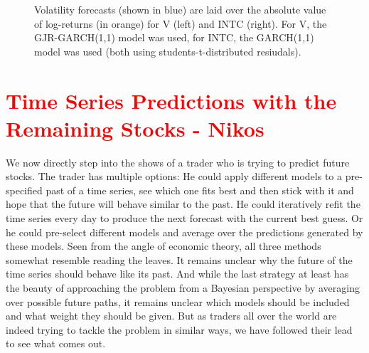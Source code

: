 \begin{figure}[h]
    \centering
    \begin{adjustbox}{width = 0.95\textwidth}
    
    
    \end{adjustbox}
    \caption{Volatility forecasts (shown in blue) are laid over the absolute value of log-returns (in orange) for V (left) and INTC (right). For V, the GJR-GARCH(1,1) model was used, for INTC, the GARCH(1,1) model was used (both using students-t-distributed resiudals).}
    \label{fig:volatility_pred}
\end{figure}{}


\section{\textcolor{red}{Time Series Predictions with the Remaining Stocks - Nikos}}

We now directly step into the shows of a trader who is trying to  predict future stocks. The trader has multiple options: He could apply different models to a pre-specified past of a time series, see which one fits best and then stick with it and hope that the future will behave similar to the past. He could iteratively refit the time series every day to produce the next forecast with the current best guess. Or he could pre-select different models and average over the predictions generated by these models. Seen from the angle of economic theory, all three methods somewhat resemble reading the leaves. It remains unclear why the future of the time series should behave like its past. And while the last strategy at least has the beauty of approaching the problem from a Bayesian perspective by averaging over possible future paths, it remains unclear which models should be included and what weight they should be given. But as traders all over the world are indeed trying to tackle the problem in similar ways, we have followed their lead to see what comes out. 

